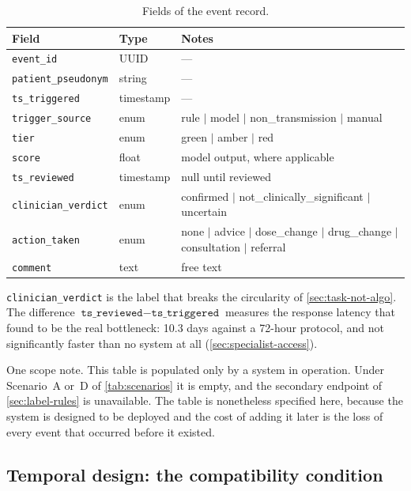 \documentclass[12pt,a4paper,oneside]{report}
\begin{document}
\begin{table}[htbp]
\centering\footnotesize
\caption{Fields of the event record.}\label{tab:event-record}
\begin{tabularx}{\textwidth}{@{}>{\raggedright\arraybackslash}p{3.3cm} >{\raggedright\arraybackslash}p{2.0cm} X@{}}
\toprule
\textbf{Field} & \textbf{Type} & \textbf{Notes} \\
\midrule
\texttt{event\_id} & UUID & --- \\
\texttt{patient\_pseudonym} & string & --- \\
\texttt{ts\_triggered} & timestamp & --- \\
\texttt{trigger\_source} & enum & rule $\mid$ model $\mid$ non\_transmission $\mid$ manual \\
\texttt{tier} & enum & green $\mid$ amber $\mid$ red \\
\texttt{score} & float & model output, where applicable \\
\texttt{ts\_reviewed} & timestamp & null until reviewed \\
\texttt{clinician\_verdict} & enum & confirmed $\mid$ not\_clinically\_significant $\mid$ uncertain \\
\texttt{action\_taken} & enum & none $\mid$ advice $\mid$ dose\_change $\mid$ drug\_change $\mid$ consultation $\mid$ referral \\
\texttt{comment} & text & free text \\
\bottomrule
\end{tabularx}
\end{table}

\texttt{clinician\_verdict} is the label that breaks the circularity of \cref{sec:task-not-algo}. The difference $\texttt{ts\_reviewed} - \texttt{ts\_triggered}$ measures the response latency that \textcite{bediang2021} found to be the real bottleneck: 10.3 days against a 72-hour protocol, and not significantly faster than no system at all (\cref{sec:specialist-access}).

One scope note. This table is populated only by a system in operation. Under Scenario~A or~D of \cref{tab:scenarios} it is empty, and the secondary endpoint of \cref{sec:label-rules} is unavailable. The table is nonetheless specified here, because the system is designed to be deployed and the cost of adding it later is the loss of every event that occurred before it existed.

\subsection{Temporal design: the compatibility condition}\label{sec:temporal}
\end{document}
